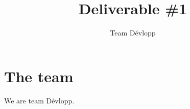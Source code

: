 \documentclass[12pt]{scrreprt}
\title{Deliverable \#1}
\author{Team D\'evlopp}
\begin{document}
\maketitle
\tableofcontents

\section{The team}
We are team D\'evlopp.
\end{document}
